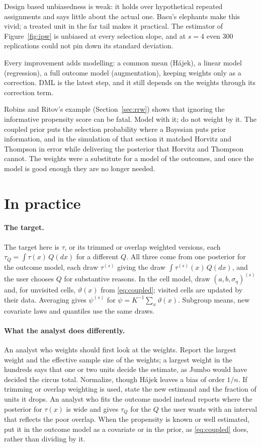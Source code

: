 Design based unbiasedness is weak: it holds over hypothetical repeated assignments and says little about the actual one. Basu's elephants make this vivid; a treated unit in the far tail makes it practical. The estimator of Figure~\ref{fig:ipw} is unbiased at every selection slope, and at $s = 4$ even 300 replications could not pin down its standard deviation.

Every improvement adds modelling: a common mean (H\'ajek), a linear model (regression), a full outcome model (augmentation), keeping weights only as a correction. DML is the latest step, and it still depends on the weights through its correction term.

Robins and Ritov's example (Section~\ref{sec:rrw}) shows that ignoring the informative propensity score can be fatal. Model with it; do not weight by it. The coupled prior puts the selection probability where a Bayesian puts prior information, and in the simulation of that section it matched Horvitz and Thompson in error while delivering the posterior that Horvitz and Thompson cannot. The weights were a substitute for a model of the outcomes, and once the model is good enough they are no longer needed.

\section{In practice}

\paragraph{The target.} The target here is $\tau$, or its trimmed or overlap weighted versions, each $\tau_Q = \int \tau(x)\,Q(dx)$ for a different $Q$. All three come from one posterior for the outcome model, each draw $\tau^{(s)}$ giving the draw $\int \tau^{(s)}(x)\,Q(dx)$, and the user chooses $Q$ for substantive reasons. In the cell model, draw $(a, b, \sigma_\eta)^{(s)}$ and, for unvisited cells, $\vartheta(x)$ from \eqref{eq:coupled}; visited cells are updated by their data. Averaging gives $\psi^{(s)}$ for $\psi = K^{-1}\sum_x \vartheta(x)$. Subgroup means, new covariate laws and quantiles use the same draws.

\paragraph{What the analyst does differently.} An analyst who weights should first look at the weights. Report the largest weight and the effective sample size of the weights; a largest weight in the hundreds says that one or two units decide the estimate, as Jumbo would have decided the circus total. Normalize, though H\'ajek leaves a bias of order $1/n$. If trimming or overlap weighting is used, state the new estimand and the fraction of units it drops. An analyst who fits the outcome model instead reports where the posterior for $\tau(x)$ is wide and gives $\tau_Q$ for the $Q$ the user wants with an interval that reflects the poor overlap. When the propensity is known or well estimated, put it in the outcome model as a covariate or in the prior, as \eqref{eq:coupled} does, rather than dividing by it.

